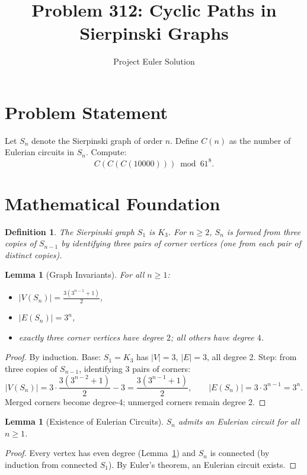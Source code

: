 \documentclass[12pt]{article}
\title{Problem 312: Cyclic Paths in Sierpinski Graphs}
\author{Project Euler Solution}
\date{}
\newtheorem{lemma}[theorem]{Lemma}
\newtheorem{definition}[theorem]{Definition}
\begin{document}
\maketitle

\section{Problem Statement}

Let $S_n$ denote the Sierpinski graph of order $n$. Define $C(n)$ as the number of Eulerian circuits in $S_n$. Compute:
\[
    C(C(C(10000))) \bmod 61^8.
\]

\section{Mathematical Foundation}

\begin{definition}
The Sierpinski graph $S_1$ is $K_3$. For $n \ge 2$, $S_n$ is formed from three copies of $S_{n-1}$ by identifying three pairs of corner vertices (one from each pair of distinct copies).
\end{definition}

\begin{lemma}[Graph Invariants]\label{lem:graph}
For all $n \ge 1$:
\begin{itemize}
    \item $|V(S_n)| = \frac{3(3^{n-1}+1)}{2}$,
    \item $|E(S_n)| = 3^n$,
    \item exactly three corner vertices have degree $2$; all others have degree $4$.
\end{itemize}
\end{lemma}

\begin{proof}
By induction. Base: $S_1 = K_3$ has $|V|=3$, $|E|=3$, all degree 2. Step: from three copies of $S_{n-1}$, identifying 3 pairs of corners:
\[
    |V(S_n)| = 3\cdot\frac{3(3^{n-2}+1)}{2} - 3 = \frac{3(3^{n-1}+1)}{2}, \qquad |E(S_n)| = 3\cdot 3^{n-1} = 3^n.
\]
Merged corners become degree-4; unmerged corners remain degree 2.
\end{proof}

\begin{lemma}[Existence of Eulerian Circuits]\label{lem:euler}
$S_n$ admits an Eulerian circuit for all $n \ge 1$.
\end{lemma}

\begin{proof}
Every vertex has even degree (Lemma~\ref{lem:graph}) and $S_n$ is connected (by induction from connected $S_1$). By Euler's theorem, an Eulerian circuit exists.
\end{proof}
\end{document}
